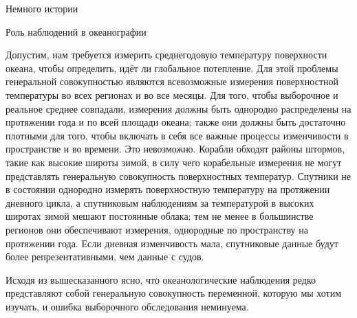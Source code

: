 \begin{chapter}{Немного истории}
\begin{section}{Роль наблюдений в океанографии}
{{Допустим, нам требуется измерить среднегодовую температуру поверхности
океана, чтобы определить, идёт ли глобальное потепление. Для
этой проблемы генеральной совокупностью являются всевозможные
измерения поверхностной температуры во всех регионах и во все
месяцы. Для того, чтобы выборочное и реальное среднее совпадали,
измерения должны быть однородно распределены на протяжении года и по
всей площади океана; также они должны быть достаточно плотными для
того, чтобы включать в себя все важные процессы изменчивости в
пространстве и во времени. Это невозможно. Корабли обходят районы
штормов, такие как высокие широты зимой, в силу чего корабельные
измерения не могут представлять генеральную совокупность поверхностных
температур. Спутники не в состоянии однородно измерять поверхностную
температуру на протяжении дневного цикла, а спутниковым наблюдениям за
температурой в высоких широтах зимой мешают постоянные облака; тем не
менее в большинстве регионов они обеспечивают измерения, однородные по
пространству на протяжении года. Если дневная изменчивость мала,
спутниковые данные будут более репрезентативными, чем данные с судов.
%

Исходя из вышесказанного ясно, что океанологические наблюдения редко
представляют собой генеральную совокупность переменной, которую мы
хотим изучать, и ошибка выборочного обследования неминуема.
%

}}
\end{section}
\end{chapter}
